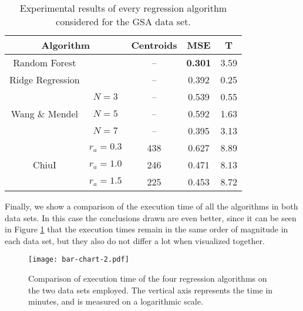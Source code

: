 \begin{table}[h!]
\centering
\caption{Experimental results of every regression algorithm considered for the GSA data set.}
\label{tab:gsa}
\begin{tabular}{ccccc}
\toprule
\multicolumn{2}{c}{Algorithm} & Centroids & MSE & T\\ \midrule
  Random Forest & & -- & \textbf{0.301} & 3.59 \\
  Ridge Regression & & -- & 0.392 &0.25\\
 \multirow{3}{*}{Wang \& Mendel} & $N=3$ & -- & 0.539 & 0.55\\
  & $N=5$ & -- & 0.592 & 1.63\\
  & $N=7$ & -- & 0.395 & 3.13\\
 \multirow{3}{*}{ChiuI} & $r_a=0.3$ & 438 & 0.627 & 8.89\\
  & $r_a=1.0$ &  246 & 0.471 & 8.13\\
  & $r_a=1.5$ &  225 & 0.453 & 8.72\\ \bottomrule
\end{tabular}
\end{table}

Finally, we show a comparison of the execution time of all the algorithms in both data sets. In this case the conclusions drawn are even better, since it can be seen in Figure \ref{fig:bar-chart-2} that the execution times remain in the same order of magnitude in each data set, but they also do not differ a lot when visualized together.

\begin{figure}[h!]
\centering
\texttt{[image: bar-chart-2.pdf]}
\caption{Comparison of execution time of the four regression algorithms on the two data sets employed. The vertical axis represents the time in minutes, and is measured on a logarithmic scale.}
\label{fig:bar-chart-2}
\end{figure}
